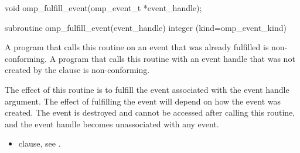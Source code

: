 \format
\begin{ccppspecific}
\begin{ompcFunction}
void omp_fulfill_event(omp_event_t *event_handle);
\end{ompcFunction}
\end{ccppspecific}

\begin{fortranspecific}
\begin{ompfFunction}
subroutine omp_fulfill_event(event_handle)
integer (kind=omp_event_kind) 
\end{ompfFunction}
\end{fortranspecific}

\constraints

A program that calls this routine on an event that was already fulfilled is non-conforming.
A program that calls this routine with an event handle that was not created by the  clause is non-conforming.

\effect

The effect of this routine is to fulfill the event associated with the event handle argument. The effect of fulfilling the event will depend on how the event was created. The event is destroyed and cannot be accessed after calling this routine, and the event handle becomes unassociated with any event.

\crossreferences

\begin{itemize}
 \item {} clause, see .
\end{itemize}
